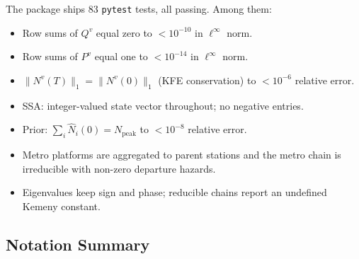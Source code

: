\documentclass[12pt,a4paper]{article}
\theoremstyle{plain}
\theoremstyle{definition}
\theoremstyle{remark}
\begin{document}
The package ships 83 \texttt{pytest} tests, all passing.  Among them:
\begin{itemize}
  \item Row sums of $Q^v$ equal zero to $<10^{-10}$ in $\ell^\infty$ norm.
  \item Row sums of $P^v$ equal one to $<10^{-14}$ in $\ell^\infty$ norm.
  \item $\|N^v(T)\|_1=\|N^v(0)\|_1$ (KFE conservation) to $<10^{-6}$ relative error.
  \item SSA: integer-valued state vector throughout; no negative entries.
  \item Prior: $\sum_i\hat{N}_i(0)=N_{\mathrm{peak}}$ to $<10^{-8}$ relative error.
  \item Metro platforms are aggregated to parent stations and the metro chain
    is irreducible with non-zero departure hazards.
  \item Eigenvalues keep sign and phase; reducible chains report an undefined
    Kemeny constant.
\end{itemize}

\subsection*{Notation Summary}
\end{document}
